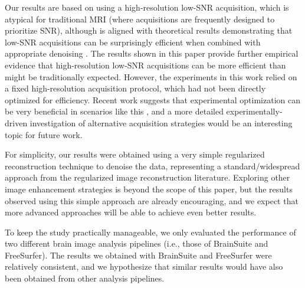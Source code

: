 \documentclass[12pt,letterpaper,onecolumn]{article}
\begin{document}
{\color{.} Our  results are based on using a high-resolution low-SNR acquisition, which is atypical for traditional MRI (where acquisitions are frequently designed to prioritize SNR), although is aligned with theoretical results demonstrating that low-SNR acquisitions can be surprisingly efficient when combined with appropriate denoising \cite{haldar2008, haldar2011a, haldar2011c, haldar2013}.  The results shown in this paper provide further empirical evidence that high-resolution low-SNR acquisitions can be more efficient than might be traditionally expected.} {\color{.} However, the experiments in this work relied on a fixed high-resolution acquisition protocol, which had not been directly optimized for efficiency.  Recent work suggests that experimental optimization can be very beneficial in scenarios like this \cite{wang2025kspace}, and a more detailed experimentally-driven investigation of alternative acquisition strategies would be an interesting topic for future work. }

For simplicity, our results were obtained using a very simple regularized reconstruction technique to denoise the data, representing a standard/widespread approach from the regularized image reconstruction literature.  Exploring other image enhancement strategies is beyond the scope of this paper, but the results observed using this simple approach are already encouraging, and we expect that more advanced approaches will be able to achieve even better results.

To keep the study practically manageable, we only evaluated the performance of two different brain image analysis pipelines (i.e., those of BrainSuite and FreeSurfer).  The results we obtained with BrainSuite and FreeSurfer were relatively consistent, and we hypothesize that similar results would have also been obtained from other analysis pipelines.
\end{document}
